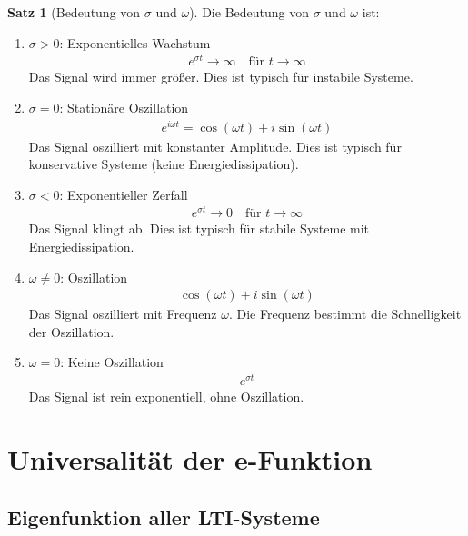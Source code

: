 ﻿\documentclass[a4paper,12pt]{report}
\theoremstyle{definition}
\newtheorem{satz}{Satz}
\begin{document}
	\begin{satz}[Bedeutung von $\sigma$ und $\omega$]
		Die Bedeutung von $\sigma$ und $\omega$ ist:
		\begin{enumerate}
			\item[-] \textbf{$\sigma > 0$}: Exponentielles Wachstum
			\begin{align}
				e^{\sigma t} \to \infty \quad \text{für } t \to \infty
			\end{align}
			Das Signal wird immer größer. Dies ist typisch für instabile Systeme.
			
			\item[-] \textbf{$\sigma = 0$}: Stationäre Oszillation
			\begin{align}
				e^{i\omega t} = \cos(\omega t) + i\sin(\omega t)
			\end{align}
			Das Signal oszilliert mit konstanter Amplitude. Dies ist typisch für konservative Systeme (keine Energiedissipation).
			
			\item[-] \textbf{$\sigma < 0$}: Exponentieller Zerfall
			\begin{align}
				e^{\sigma t} \to 0 \quad \text{für } t \to \infty
			\end{align}
			Das Signal klingt ab. Dies ist typisch für stabile Systeme mit Energiedissipation.
			
			\item[-] \textbf{$\omega \neq 0$}: Oszillation
			\begin{align}
				\cos(\omega t) + i\sin(\omega t)
			\end{align}
			Das Signal oszilliert mit Frequenz $\omega$. Die Frequenz bestimmt die Schnelligkeit der Oszillation.
			
			\item[-] \textbf{$\omega = 0$}: Keine Oszillation
			\begin{align}
				e^{\sigma t}
			\end{align}
			Das Signal ist rein exponentiell, ohne Oszillation.
		\end{enumerate}
	\end{satz}
	
	\section{Universalität der e-Funktion}
	
	\subsection{Eigenfunktion aller LTI-Systeme}
	
\end{document}
